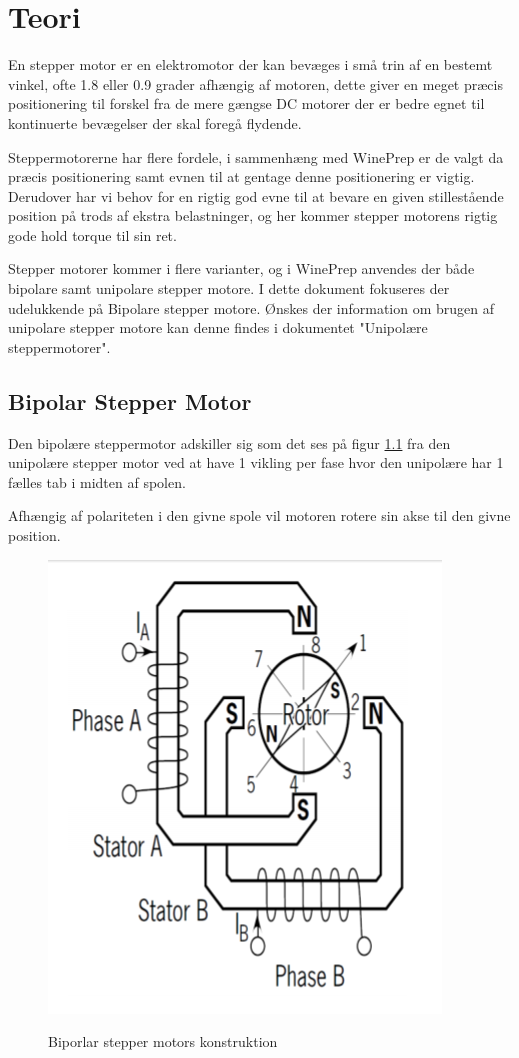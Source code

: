 \chapter{Teori}

En stepper motor er en elektromotor der kan bevæges i små trin af en bestemt vinkel, ofte 1.8 eller 0.9 grader afhængig af motoren, dette giver en meget præcis positionering til forskel fra de mere gængse DC motorer der er bedre egnet til kontinuerte bevægelser der skal foregå flydende.

Steppermotorerne har flere fordele, i sammenhæng med WinePrep er de valgt da præcis positionering samt evnen til at gentage denne positionering er vigtig. Derudover har vi behov for en rigtig god evne til at bevare en given stillestående position på trods af ekstra belastninger, og her kommer stepper motorens rigtig gode hold torque til sin ret.

Stepper motorer kommer i flere varianter, og i WinePrep anvendes der både bipolare samt unipolare stepper motore. I dette dokument fokuseres der udelukkende på Bipolare stepper motore. Ønskes der information om brugen af unipolare stepper motore kan denne findes i dokumentet "Unipolære steppermotorer".

\section{Bipolar Stepper Motor}

Den bipolære steppermotor adskiller sig som det ses på figur \ref{bipolarlayout} fra den unipolære stepper motor ved at have 1 vikling per fase hvor den unipolære har 1 fælles tab i midten af spolen.

Afhængig af polariteten i den givne spole vil motoren rotere sin akse til den givne position.

\begin{figure}[H]
	\centering
	\caption{Biporlar stepper motors konstruktion}
	\includegraphics{billeder/konstruktion}
	\label{bipolarlayout}
\end{figure}

